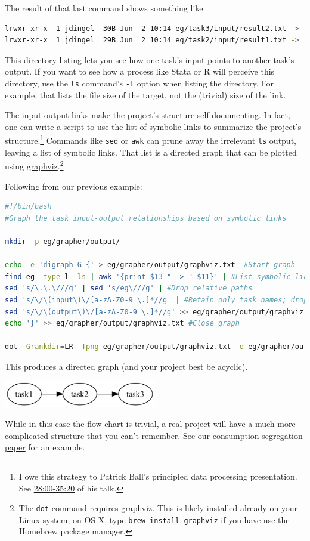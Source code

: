 The result of that last command shows something like 
\begin{lstlisting}[language=bash]
lrwxr-xr-x  1 jdingel  30B Jun  2 10:14 eg/task3/input/result2.txt -> ../../task2/output/result2.txt
lrwxr-xr-x  1 jdingel  29B Jun  2 10:14 eg/task2/input/result1.txt -> ../../task1/output/result.txt
\end{lstlisting}
This directory listing lets you see how one task's input points to another task's output.
If you want to see how a process like Stata or R will perceive this directory,
use the \texttt{ls} command's \texttt{-L} option when listing the directory.
For example, that lists the file size of the target, not the (trivial) size of the link.

The input-output links make the project's structure self-documenting.
In fact, one can write a script to use the list of symbolic links to summarize the project's structure.\footnote{
	I owe this strategy to Patrick Ball's principled data processing presentation.
	See \href{https://www.youtube.com/watch?v=ZSunU9GQdcI&t=28m00s}{28:00-35:20} of his talk.
}
Commands like \texttt{sed} or \texttt{awk} can prune away the irrelevant \texttt{ls} output,
leaving a list of symbolic links.
That list is a directed graph that can be plotted using \href{https://en.wikipedia.org/wiki/Graphviz}{graphviz}.\footnote{
	The \texttt{dot} command requires \href{https://www.graphviz.org/}{graphviz}. 
	This is likely installed already on your Linux system; 
	on OS X, type \texttt{brew install graphviz} if you have use the Homebrew package manager.
}

Following from our previous example:
\begin{lstlisting}[language=bash]
#!/bin/bash
#Graph the task input-output relationships based on symbolic links

mkdir -p eg/grapher/output/

echo -e 'digraph G {' > eg/grapher/output/graphviz.txt  #Start graph
find eg -type l -ls | awk '{print $13 " -> " $11}' | #List symbolic links
sed 's/\.\.\///g' | sed 's/eg\///g' | #Drop relative paths
sed 's/\/\(input\)\/[a-zA-Z0-9_\.]*//g' | #Retain only task names; drop filenames
sed 's/\/\(output\)\/[a-zA-Z0-9_\.]*//g' >> eg/grapher/output/graphviz.txt #Ditto; write to file
echo '}' >> eg/grapher/output/graphviz.txt #Close graph

dot -Grankdir=LR -Tpng eg/grapher/output/graphviz.txt -o eg/grapher/output/task_flow.png
\end{lstlisting}
This produces a directed graph (and your project best be acyclic).
\begin{center}
\includegraphics[width=0.5\textwidth]{./figures/workflow/tasks_flow_graph_trivialexample.png}
\end{center}
While in this case the flow chart is trivial, a real project will have a much more complicated structure that you can't remember.
See our \href{https://github.com/jdingel/DavisDingelMonrasMorales}{consumption segregation paper} for an example.

